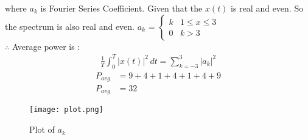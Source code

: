\documentclass[journal,12pt,twocolumn]{IEEEtran}
\begin{document}
where $a_k$ is Fourier Series Coefficient.
Given that the $x(t)$ is real and even. So the spectrum is also real and even.
$a_k$ = $\begin{cases} 
            k & 1\leq x\leq 3\\
            0 & k>3
        \end{cases}$\\  
$\therefore$ Average power is :
\begin{align}
    \frac{1}{T}\int_{0}^{T}\lvert x(t)\rvert^2\,dt = \sum_{k=-3}^{3}\lvert a_k\rvert^2
\end{align}
\begin{align}
    P_{avg} &= 9+4+1+4+1+4+9\\
    P_{avg} &= 32
\end{align}
\begin{figure}[!h]
         \centering
         \texttt{[image: plot.png]}
         \caption{Plot of $a_k$}
         \label{plot}
\end{figure}
\end{document}
